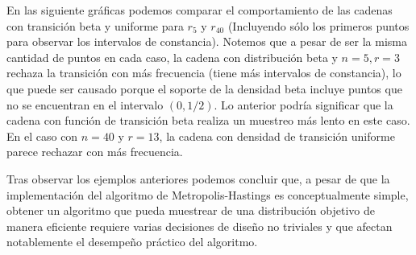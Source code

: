 \documentclass{article}
\begin{document}
\begin{enumerate}
    En las siguiente gráficas podemos comparar el comportamiento de las cadenas con transición beta y
    uniforme para $r_5$ y $r_{40}$ (Incluyendo sólo los primeros puntos para observar los intervalos de constancia). 
    Notemos que a pesar de ser la misma cantidad de puntos en cada caso,
    la cadena con distribución beta y $n=5, r=3$ rechaza la transición con más frecuencia (tiene más intervalos 
    de constancia), lo que puede ser causado porque
    el soporte de la densidad beta incluye puntos que no se encuentran en el intervalo $(0,1/2)$.
    Lo anterior podría significar que la cadena con función de transición beta realiza un muestreo más
    lento en este caso. En el caso con $n=40$ y $r=13$, la cadena con densidad de transición uniforme
    parece rechazar con más frecuencia.

    \begin{center}
        
        

        
        
    \end{center}

    Tras observar los ejemplos anteriores podemos concluir que, a pesar de que la implementación del
    algoritmo de Metropolis-Hastings es conceptualmente simple, obtener un algoritmo que pueda muestrear
    de una distribución objetivo de manera eficiente requiere varias decisiones de diseño no triviales
    y que afectan notablemente el desempeño práctico del algoritmo.
   
\end{enumerate}




 
\end{document}
